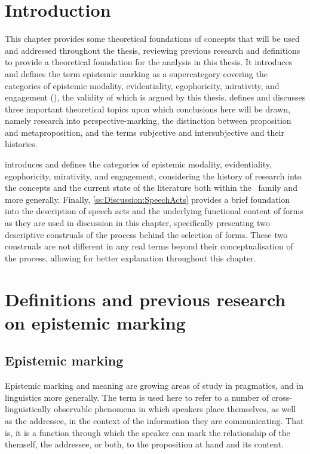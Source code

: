 \section{Introduction}
This chapter provides some theoretical foundations of concepts that will be used and addressed throughout the thesis, reviewing previous research and definitions to provide a theoretical foundation for the analysis in this thesis. It introduces and defines the term epistemic marking as a supercategory covering the categories of epistemic modality, evidentiality, egophoricity, mirativity, and engagement (), the validity of which is argued by this thesis.  defines and discusses three important theoretical topics upon which conclusions here will be drawn, namely research into perspective-marking, the distinction between proposition and metaproposition, and the terms subjective and intersubjective and their histories.

 introduces and defines the categories of epistemic modality, evidentiality, egophoricity, mirativity, and engagement, considering the history of research into the concepts and the current state of the literature both within the \lfam\ family and more generally. Finally, \ref{ss:Discussion:SpeechActs} provides a brief foundation into the description of speech acts and the underlying functional content of forms as they are used in discussion in this chapter, specifically presenting two descriptive construals of the process behind the selection of forms. These two construals are not different in any real terms beyond their conceptualisation of the process, allowing for better explanation throughout this chapter.

\section{Definitions and previous research on epistemic marking}\label{s:Intro:EpistemicIntro}
\subsection{Epistemic marking}
Epistemic marking and meaning are growing areas of study in pragmatics, and in linguistics more generally. The term is used here to refer to a number of cross-linguistically observable phenomena in which speakers place themselves, as well as the addressee, in the context of the information they are communicating. That is, it is a function through which the speaker can mark the relationship of the themself, the addressee, or both, to the proposition at hand and its content. 

